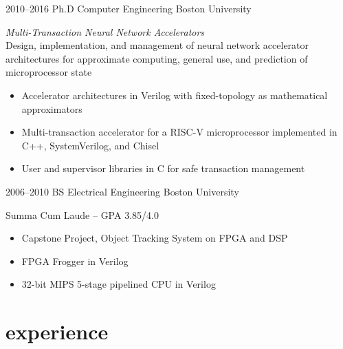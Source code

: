 \documentclass[]{friggeri-cv} %
\begin{document}
\begin{entrylist}


\entry
{2010--2016}
{Ph.D {\normalfont Computer Engineering}}
{Boston University}
{\emph{Multi-Transaction Neural Network Accelerators} \\
  Design, implementation, and management of neural network accelerator architectures for approximate computing, general use, and prediction of microprocessor state
  \begin{itemize}
  \item Accelerator architectures in Verilog with fixed-topology as mathematical approximators
  \item Multi-transaction accelerator for a RISC-V microprocessor implemented in C++, SystemVerilog, and Chisel
  \item User and supervisor libraries in C for safe transaction management
  \end{itemize}
}


\entry
{2006--2010}
{BS {\normalfont Electrical Engineering}}
{Boston University}
{Summa Cum Laude -- GPA 3.85/4.0
  \begin{itemize}
  \item Capstone Project, Object Tracking System on FPGA and DSP
  \item FPGA Frogger in Verilog
  \item 32-bit MIPS 5-stage pipelined CPU in Verilog
  \end{itemize}
}


\end{entrylist}


\section{experience}

\end{document}
